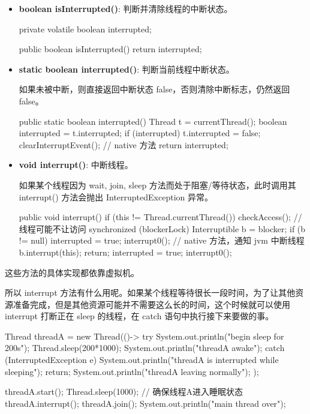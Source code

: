 \begin{itemize}
    \item \textbf{boolean isInterrupted()}: 判断并清除线程的中断状态。
\begin{Java}
private volatile boolean interrupted;

public boolean isInterrupted() {
    return interrupted;
}
\end{Java}
    \item \textbf{static boolean interrupted()}: 判断当前线程中断状态。
    
如果未被中断，则直接返回中断状态 false，否则清除中断标志，仍然返回 false。

\begin{Java}
public static boolean interrupted() {
    Thread t = currentThread();
    boolean interrupted = t.interrupted;
    if (interrupted) {
        t.interrupted = false;
        clearInterruptEvent();  // native 方法
    }
    return interrupted;
}
\end{Java}
    \item \textbf{void interrupt()}: 中断线程。
    
如果某个线程因为 wait, join, sleep 方法而处于阻塞/等待状态，此时调用其 interrupt() 方法会抛出 InterruptedException 异常。

\begin{Java}
public void interrupt() {
    if (this != Thread.currentThread()) {
        checkAccess();  // 线程可能不让访问
        synchronized (blockerLock) {
            Interruptible b = blocker;
            if (b != null) {
                interrupted = true;
                interrupt0();  // native 方法，通知 jvm 中断线程
                b.interrupt(this);
                return;
            }
        }
    }
    interrupted = true;
    interrupt0();
}
\end{Java}    
\end{itemize}

这些方法的具体实现都依靠虚拟机。

所以 interrupt 方法有什么用呢。如果某个线程等待很长一段时间，为了让其他资源准备完成，但是其他资源可能并不需要这么长的时间，这个时候就可以使用 interrupt 打断正在 sleep 的线程，在 catch 语句中执行接下来要做的事。

\begin{Java}
Thread threadA = new Thread(()->{
    try {
        System.out.println("begin sleep for 200s");
        Thread.sleep(200*1000);
        System.out.println("threadA awake");
    } catch (InterruptedException e) {
        System.out.println("threadA is interrupted while sleeping");
        return;
    }
    System.out.println("threadA leaving normally");
});

threadA.start();
Thread.sleep(1000); // 确保线程A进入睡眠状态
threadA.interrupt();
threadA.join();
System.out.println("main thread over");
\end{Java}

